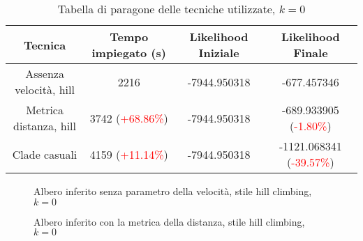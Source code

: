 \begin{table}[!h]
    \centering
    \begin{tabular}{c | c | c | c }
        Tecnica & Tempo impiegato (s) & Likelihood Iniziale & Likelihood Finale \\ \midrule \midrule 
        Assenza velocità, hill & 2216 & -7944.950318 & -677.457346 \\
        Metrica distanza, hill & 3742 (\textcolor{red}{+68.86\%}) & -7944.950318 & -689.933905 (\textcolor{red}{-1.80\%}) \\
        Clade casuali & 4159 (\textcolor{red}{+11.14\%}) & -7944.950318 & -1121.068341 (\textcolor{red}{-39.57\%})
    \end{tabular}
    \caption{Tabella di paragone delle tecniche utilizzate, $k = 0$}
    \label{tab:results-table-dollo-0}
\end{table}

\begin{figure}[!h]
    \centering
    \caption{Albero inferito senza parametro della velocità, stile hill climbing, $k = 0$}
    \label{fig:results-tree-dollo-0-1}
\end{figure}

\begin{figure}[!h]
    \centering
    \caption{Albero inferito con la metrica della distanza, stile hill climbing, $k = 0$}
    \label{fig:results-tree-dollo-0-2}
\end{figure}

